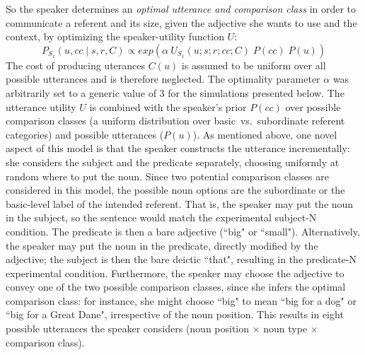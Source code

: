 So the speaker determines an \emph{optimal utterance and comparison class} in order to communicate a referent and its size, given the adjective she wants to use and the context, by optimizing the speaker-utility function $U$:
\begin{equation}
P_{S_1} (u, cc \mid s, r, C)  \propto exp(\alpha \: U_{S_1}(u; s; r; cc; C) \; P(cc) \; P(u)) 
\end{equation}
The cost of producing uterances $C(u)$ is assumed to be uniform over all possible utterances and is therefore neglected. The optimality parameter $\alpha$ was arbitrarily set to a generic value of 3 for the simulations presented below. The utterance utility $U$ is combined with the speaker's prior $P(cc)$ over possible comparison classes (a uniform distribution over basic~vs.~subordinate referent categories) and possible utterances ($P(u)$).
As mentioned above, one novel aspect of this model is that the speaker constructs the utterance incrementally: she considers the subject and the predicate separately, choosing uniformly at random where to put the noun. Since two potential comparison classes are considered in this model, the possible noun options are the subordinate or the basic-level label of the intended referent. That is, the speaker may put the noun in the subject, so the sentence would match the experimental subject-N condition. The predicate is then a bare adjective (``big" or ``small"). Alternatively, the speaker may put the noun in the predicate, directly modified by the adjective; the subject is then the bare deictic ``that", resulting in the predicate-N experimental condition. Furthermore, the speaker may choose the adjective to convey one of the two possible comparison classes, since she infers the optimal comparison class: for instance, she might choose ``big" to mean ``big for a dog" or ``big for a Great Dane", irrespective of the noun position. This results in eight possible utterances the speaker considers (noun position $\times$ noun type $\times$ comparison class).  

